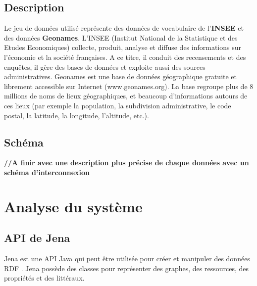 \documentclass{article}
\begin{document}
\subsection{Description}
Le jeu de données utilisé représente des données de vocabulaire de l'\textbf{INSEE} et des données\textbf{ Geonames}.
L’INSEE (Institut National de la Statistique et des Etudes Economiques) collecte, produit, analyse et diffuse des informations sur l'économie et la société françaises. A ce titre, il conduit des recensements et des enquêtes, il gère des bases de données et exploite aussi des sources administratives.
Geonames est une base de données géographique gratuite et librement accessible sur Internet (www.geonames.org). La base regroupe plus de 8 millions de noms de lieux géographiques, et beaucoup d’informations autours de ces lieux (par exemple la  population, la subdivision administrative, le code postal, la latitude, la longitude, l'altitude, etc.). 
\\
\subsection{Schéma}


\textbf{//A finir avec une description plus précise de chaque données avec un schéma d'interconnexion
}

\section{Analyse du système}

\subsection{API de Jena}
Jena est une API Java qui peut être utilisée pour créer et manipuler des données RDF . Jena possède des classes pour représenter des graphes, des ressources, des propriétés et des littéraux.
\end{document}

